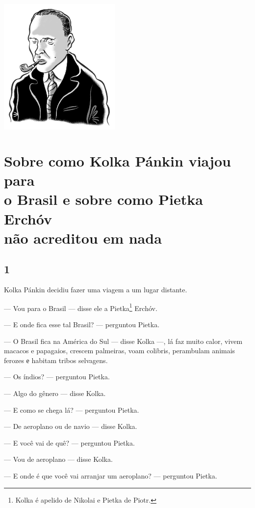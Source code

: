 \pagebreak
\thispagestyle{empty}
\mbox{}
\vfill
\begin{center}
\includegraphics[width=6cm]{./imgs/autor12.jpg}
\end{center}

\chapter{Sobre como Kolka Pánkin viajou para\\ o Brasil e sobre como Pietka Erchóv\\ não acreditou em nada}

\section{1}

\noindent{}Kolka Pánkin decidiu fazer uma viagem a um lugar distante.

--- Vou para o Brasil --- disse ele a Pietka\footnote{Kolka é apelido de Nikolai e Pietka de Piotr.} Erchóv.

--- E onde fica esse tal Brasil? --- perguntou Pietka.

--- O Brasil fica na América do Sul --- disse Kolka ---, lá faz muito
calor, vivem macacos e papagaios, crescem palmeiras, voam colibris,
perambulam animais ferozes е habitam tribos selvagens.

--- Os índios? --- perguntou Pietka.

--- Algo do gênero --- disse Kolka.

--- E como se chega lá? --- perguntou Pietka.

--- De aeroplano ou de navio --- disse Kolka.

--- E você vai de quê? --- perguntou Pietka.

--- Vou de aeroplano --- disse Kolka.

--- E onde é que você vai arranjar um aeroplano? --- perguntou Pietka.

